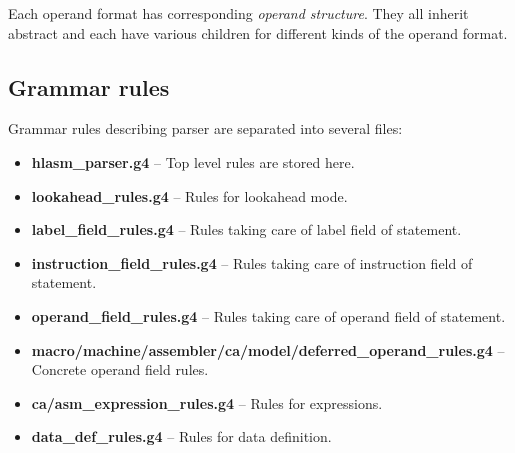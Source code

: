 Each operand format has corresponding \emph{operand structure}. They all inherit abstract  and each have various children for different kinds of the operand format.

\subsection{Grammar rules}

Grammar rules describing parser are separated into several files:
\begin{itemize}
	\item \textbf{hlasm\_parser.g4} -- Top level rules are stored here.
	\item \textbf{lookahead\_rules.g4} -- Rules for lookahead mode.
	\item \textbf{label\_field\_rules.g4} -- Rules taking care of label field of statement.
	\item \textbf{instruction\_field\_rules.g4} -- Rules taking care of instruction field of statement.
	\item \textbf{operand\_field\_rules.g4} -- Rules taking care of operand field of statement.
	\item \textbf{macro/machine/assembler/ca/model/deferred\_operand\_rules.g4} -- Concrete operand field rules.
	\item \textbf{ca/asm\_expression\_rules.g4} -- Rules for expressions.
	\item \textbf{data\_def\_rules.g4} -- Rules for data definition.
\end{itemize}

